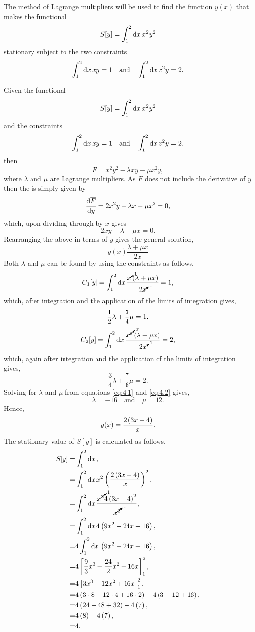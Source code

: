\begin{question}
The method of Lagrange multipliers will be used to find the function $y(x)$ that makes the functional
\[
	S[y] = \int_{1}^{2}\mathrm{d} x\, x^2 y^2
\]
stationary subject to the two constraints
\[
	\int_{1}^{2}\mathrm{d} x\, x y = 1\quad\text{and}\quad\int_{1}^{2}\mathrm{d} x\, x^2 y = 2.
\]
\end{question}
Given the functional
\[
	S[y] = \int_{1}^{2}\mathrm{d} x\, x^2 y^2
\]
and the constraints 
\[
	\int_{1}^{2}\mathrm{d} x\, x y = 1\quad\text{and}\quad\int_{1}^{2}\mathrm{d} x\, x^2 y = 2.
\]
then
\[
	\overline{F} = x^2y^2 - \lambda x y - \mu x^2 y,
\]
where $\lambda$ and $\mu$ are Lagrange multipliers.  As $\overline{F}$ does not include the derivative of $y$ then the \el is simply given by
\[
	\frac{\mathrm{d}\overline{F}}{\mathrm{d}y} = 2x^2y-\lambda x - \mu x^2 = 0,
\]
which, upon dividing through by $x$ gives
\[
	2xy-\lambda - \mu x = 0.
\]
Rearranging the above in terms of $y$ gives the general solution,
\[
	y(x) \frac{\lambda + \mu x}{2x}
\]
Both $\lambda$ and $\mu$ can be found by using the constraints as follows.
\[
	C_1[y] = \int_{1}^{2}\mathrm{d} x\, \frac{\cancelto{1}{x}\left(\lambda + \mu x\right)}{2\cancelto{1}{x}} = 1,
\]
which, after integration and the application of the limits of integration gives,
\begin{equation}
	\label{eq:4.1}
	\frac{1}{2} \lambda + \frac{3}{4}\mu=1.
\end{equation}
\[
	C_2[y] = \int_{1}^{2}\mathrm{d} x\, \frac{\cancelto{x}{x^2}\left(\lambda + \mu x\right)}{2\cancelto{1}{x}} = 2,
\]
which, again after integration and the application of the limits of integration gives,
\begin{equation}
	\label{eq:4.2}
	\frac{3}{4} \lambda + \frac{7}{6}\mu=2.
\end{equation}
Solving for $\lambda$ and $\mu$ from equations \eqref{eq:4.1} and \eqref{eq:4.2} gives,
\[
	\lambda = -16\quad\text{and}\quad \mu = 12.
\]
Hence,
\[
	y(x) = \frac{2\left(3x-4\right)}{x}.
\]
The stationary value of $S[y]$ is calculated as follows.
\begin{align*}
	S[y] =& \int_{1}^{2}\mathrm{d} x\,,\\
	=& \int_{1}^{2}\mathrm{d} x\, x^2\left(\frac{2\left(3x-4\right)}{x}\right)^2,\\
	=& \int_{1}^{2}\mathrm{d} x\,\frac{\cancelto{1}{x^2}4\left(3x-4\right)^2}{\cancelto{1}{x^2}},\\
	=& \int_{1}^{2}\mathrm{d} x\,4\left(9x^2-24x+16\right),\\
	=& 4\int_{1}^{2}\mathrm{d} x\,\left(9x^2-24x+16\right),\\
	=&4\left[\frac{9}{3}x^3-\frac{24}{2}x^2+16x\right]_1^2,\\
	=&4\left[3x^3-12x^2+16x\right]_1^2,\\
	=&4\left(3\cdot8-12\cdot4+16\cdot2\right)-4\left(3-12+16\right),\\
	=&4\left(24-48+32\right)-4\left(7\right),\\
	=&4\left(8\right)-4\left(7\right),\\
	=&4.
\end{align*}